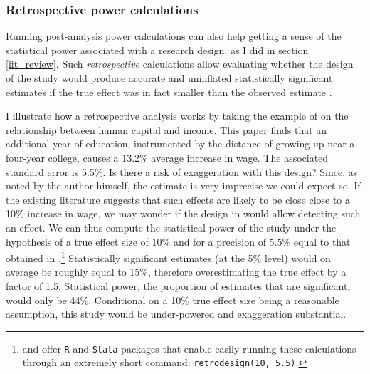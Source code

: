 \documentclass[usletter, 12pt]{article}
\begin{document}
				
			\subsubsection{Retrospective power calculations}\label{retro_calc}
			
				Running post-analysis power calculations can also help getting a sense of the statistical power associated with a research design, as I did in section \ref{lit_review}. Such \textit{retrospective} calculations allow evaluating whether the design of the study would produce accurate and uninflated statistically significant estimates if the true effect was in fact smaller than the observed estimate \citep{gelman_beyond_2014, ioannidis_power_2017, stommes_reliability_2021}. 
				
				I illustrate how a retrospective analysis works by taking the example of \cite{card_using_1993} on the relationship between human capital and income. This paper finds that an additional year of education, instrumented by the distance of growing up near a four-year college, causes a 13.2\% average increase in wage. The associated standard error is 5.5\%. Is there a risk of exaggeration with this design? Since, as noted by the author himself, the estimate is very imprecise we could expect so. If the existing literature suggests that such effects are likely to be close close to a 10\% increase in wage, we may wonder if the design in \cite{card_using_1993} would allow detecting such an effect. We can thus compute the statistical power of the study under the hypothesis of a true effect size of 10\% and for a precision of 5.5\% equal to that obtained in \cite{card_using_1993}.\footnote{\cite{timm_retrodesign_2019} and \cite{linden_retrodesign_2019} offer \texttt{R} and \texttt{Stata} packages that enable easily running these calculations through an extremely short command: \texttt{retrodesign(10, 5.5)}.} Statistically significant estimates (at the 5\% level) would on average be roughly equal to 15\%, therefore overestimating the true effect by a factor of 1.5. Statistical power, the proportion of estimates that are significant, would only be 44\%. Conditional on a 10\% true effect size being a reasonable assumption, this study would be under-powered and exaggeration substantial.
			
\end{document}
